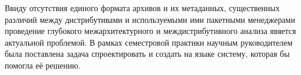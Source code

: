 Ввиду отсутствия единого формата архивов и их метаданных, существенных различий между дистрибутивами и используемыми ими пакетными менеджерами проведение глубокого межархитектурного и междистрибутивного анализа явяется актуальной проблемой.
В рамках семестровой практики научным руководителем была поставлена задача спроектировать и создать на языке {\python} систему, которая бы помогла её решению.
